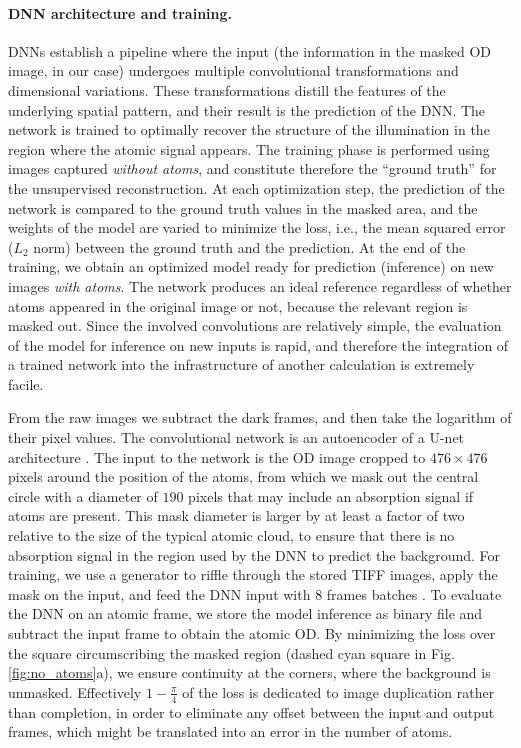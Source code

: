 \documentclass[twocolumn,groupedaddress,longbibliography]{revtex4-1}
\begin{document}
\paragraph*{DNN architecture and training.}
DNNs establish a pipeline where the input (the information in the masked OD image, in our case) undergoes multiple convolutional transformations and dimensional variations. These transformations distill the features of the underlying spatial pattern, and their result is the prediction of the DNN. The network is trained to optimally recover the structure of the illumination in the region where the atomic signal appears. The training phase is performed using images captured \emph{without atoms}, and constitute therefore the ``ground truth'' for the unsupervised reconstruction. At each optimization step, the prediction of the network is compared to the ground truth values in the masked area, and the weights of the model are varied to minimize the loss, i.e., the mean squared error ($L_2$ norm) between the ground truth and the prediction.
At the end of the training, we obtain an optimized model ready for prediction (inference) on new images \emph{with atoms}. The network produces an ideal reference regardless of whether atoms appeared in the original image or not, because the relevant region is masked out. Since the involved convolutions are relatively simple, the evaluation of the model for inference on new inputs is rapid, and therefore the integration of a trained network into the infrastructure of another calculation is extremely facile.

From the raw images we subtract the dark frames, and then take the logarithm of their pixel values. The convolutional network is an autoencoder of a U-net architecture \cite{Ronneberger2015}. The input to the network is the OD image cropped to $476\times 476$ pixels around the position of the atoms, from which we mask out the central circle with a diameter of $190$ pixels \cite{calibration} that may include an absorption signal if atoms are present. This mask diameter is larger by at least a factor of two relative to the size of the typical atomic cloud, to ensure that there is no absorption signal in the region used by the DNN to predict the background.
For training, we use a generator to riffle through the stored TIFF images, apply the mask on the input, and feed the DNN input with $8$ frames batches \cite{chollet2015keras}. To evaluate the DNN on an atomic frame, we store the model inference as binary file and subtract the input frame to obtain the atomic OD.
By minimizing the loss over the square circumscribing the masked region (dashed cyan square in Fig.\,\ref{fig:no_atoms}a), we ensure continuity at the corners, where the background is unmasked. Effectively $1-\frac{\pi}{4}$ of the loss is dedicated to image duplication rather than completion, in order to eliminate any offset between the input and output frames, which might be translated into an error in the number of atoms.
\end{document}
